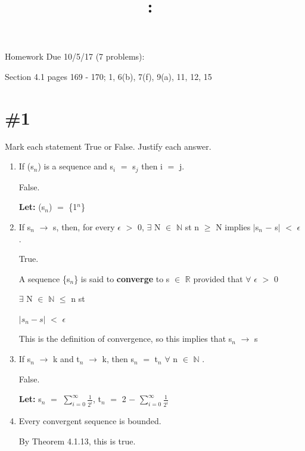 \documentclass{article}
\title{
    \vspace{2in}
    \textmd{\textbf{\hmwkClass:\ \hmwkTitle}}\\
    \normalsize\vspace{0.1in}\small\vspace{0.1in}\large{\textit{\hmwkClassInstructor}}
    \vspace{3in}
}
\author{\hmwkAuthorName}
\date{}
\newcommand{\mt}[1]{\ensuremath{#1}}
\newcommand\bsc[2][\DefaultOpt]{%
  \def\DefaultOpt{#2}%
  \section[#1]{#2}%
}
\newcommand{\balist}{\begin{enumerate}[label=\alph*.]}
\newcommand{\elist}{\end{enumerate}}
\newcommand{\lt}[1]{\textbf{Let: } #1}
\newcommand{\br}{\mt{\mathbb{R}} }       %
\newcommand{\bn}{\mt{\mathbb{N}} }       %
\newcommand{\ep}{\mt{\epsilon} }         %
\newcommand{\fa}{\mt{\forall} }          %
\newcommand{\mem}{\mt{\in} }
\newcommand{\exs}{\mt{\exists} }
\newcommand{\lra}{ \mt{\longrightarrow} } %
\newcommand{\prn}[1]{(#1)}
\newcommand{\bk}[1]{\{#1\}}
\newcommand{\ms}{\mt{-} }
\newcommand{\eql}{\mt{=} }
\newcommand{\uw}[2]{#1\mt{_{#2}}}
\newcommand{\uf}[2]{#1\mt{^{#2}}}
\newcommand{\frc}[2]{\mt{\frac{#1}{#2}}}
\begin{document}
Homework Due 10/5/17 (7 problems): 

Section 4.1 pages 169 - 170; 1, 6(b), 7(f), 9(a), 11, 12, 15

\bsc{\#1}{

Mark each statement True or False. Justify each answer.

\balist
\item If (\uw{s}{n}) is a sequence and \uw{s}{i} \eql \uw{s}{j} then i \eql j.
	
	False.
	
	\lt{\prn{\uw{s}{n}}} \eql \bk{\uf{1}{n}}
\item If \uw{s}{n} \lra s, then, for every \ep $>$ 0, \exs N \mem \bn st n $\geq$ N implies $|$\uw{s}{n} $-$ s$|$ $<$ \ep.
	
	True.
	
	A sequence \{\uw{s}{n}\} is said to \textbf{converge} to s \mem \br provided that \fa \ep $>$ 0

	\exs N \mem \bn $\leq$ n st 

	$|\uw{s}{n} - s|$ $<$ \ep \textrm{   }
	
	This is the definition of convergence, so this implies that \uw{s}{n} \lra s
\item If \uw{s}{n} \lra k and \uw{t}{n} \lra k, then \uw{s}{n} \eql \uw{t}{n} \fa n \mem \bn.
	
	False.
	
	\lt{\uw{s}{n} \eql $\sum_{i = 0}^\infty$\frc{1}{2^i}, \uw{t}{n} \eql 2 \ms $\sum_{i = 0}^\infty$\frc{1}{2^i} }
\item Every convergent sequence is bounded.
	
	By Theorem 4.1.13, this is true.
\elist
}
\newpage
\end{document}

